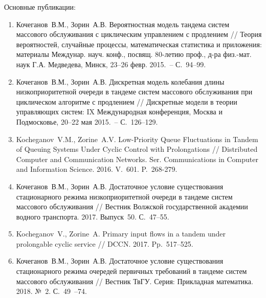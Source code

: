 \documentclass[10pt]{beamer}
\begin{document}
\begin{frame}[allowframebreaks]{Основные публикации:}
    \begin{enumerate}
    
   \item Кочеганов~В.М., Зорин~А.В. Вероятностная модель тандема систем массового обслуживания с циклическим управлением с продлением // Теория вероятностей, случайные процессы, математическая статистика и приложения: материалы Междунар. науч. конф., посвящ. 80-летию проф., д-ра физ.-мат. наук Г.А. Медведева, Минск, 23–26 февр. 2015.~-- С.~94–99.
\item Кочеганов~В.М., Зорин~А.В. Дискретная модель колебания длины низкоприоритетной очереди в тандеме систем массового обслуживания при циклическом алгоритме с продлением // Дискретные модели в теории управляющих систем: IX Международная конференция, Москва и Подмосковье, 20–22 мая 2015.~-- С.~126–129.
\item Kocheganov~V.M., Zorine~A.V. Low-Priority Queue Fluctuations in Tandem of Queuing Systems Under Cyclic Control with Prolongations // Distributed Computer and Communication Networks. Ser. Communications in Computer and Information Science. 2016. V.~601. P.~268-279.



\item Кочеганов~В.М., Зорин~А.В. Достаточное условие существования стационарного режима низкоприоритетной очереди в тандеме систем массового обслуживания // Вестник Волжской государственной академии водного транспорта. 2017. Выпуск~50. С.~47–55.


\item
Kocheganov~V., Zorine~A. Primary input flows in a tandem under prolongable cyclic service // DCCN. 2017. Pp.~517--525.

\item Кочеганов~В.М., Зорин~А.В. Достаточное условие существования стационарного режима очередей первичных требований в тандеме систем массового обслуживания // Вестник ТвГУ. Серия: Прикладная математика. 2018. №~2. С.~49~--74.




\end{enumerate}
\end{frame}
\end{document}
